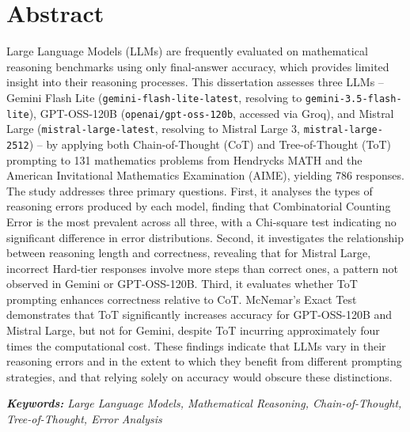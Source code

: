 \documentclass[a4paper,11pt,twoside]{report}
\begin{document}
\chapter*{Abstract}

Large Language Models (LLMs) are frequently evaluated on mathematical
reasoning benchmarks using only final-answer accuracy, which provides
limited insight into their reasoning processes. This dissertation
assesses three LLMs -- Gemini Flash Lite (\texttt{gemini-flash-lite-latest},
resolving to \texttt{gemini-3.5-flash-lite}), GPT-OSS-120B
(\texttt{openai/gpt-oss-120b}, accessed via Groq), and Mistral Large
(\texttt{mistral-large-latest}, resolving to Mistral Large 3,
\texttt{mistral-large-2512}) -- by applying both Chain-of-Thought (CoT)
and Tree-of-Thought (ToT) prompting to 131 mathematics problems from
Hendrycks MATH and the American Invitational Mathematics Examination
(AIME), yielding 786 responses. The study addresses three primary
questions. First, it analyses the types of reasoning errors produced by
each model, finding that Combinatorial Counting Error is the most
prevalent across all three, with a Chi-square test indicating no
significant difference in error distributions. Second, it investigates
the relationship between reasoning length and correctness, revealing
that for Mistral Large, incorrect Hard-tier responses involve more
steps than correct ones, a pattern not observed in Gemini or
GPT-OSS-120B. Third, it evaluates whether ToT prompting enhances
correctness relative to CoT. McNemar's Exact Test demonstrates that ToT
significantly increases accuracy for GPT-OSS-120B and Mistral Large,
but not for Gemini, despite ToT incurring approximately four times the
computational cost. These findings indicate that LLMs vary in their
reasoning errors and in the extent to which they benefit from different
prompting strategies, and that relying solely on accuracy would obscure
these distinctions.

\vspace{30pt}
\emph{\textbf{Keywords:} Large Language Models, Mathematical Reasoning, Chain-of-Thought, Tree-of-Thought, Error Analysis}

\newpage

\parskip=12pt

\tableofcontents

\newpage
{}
\listoffigures
\end{document}
